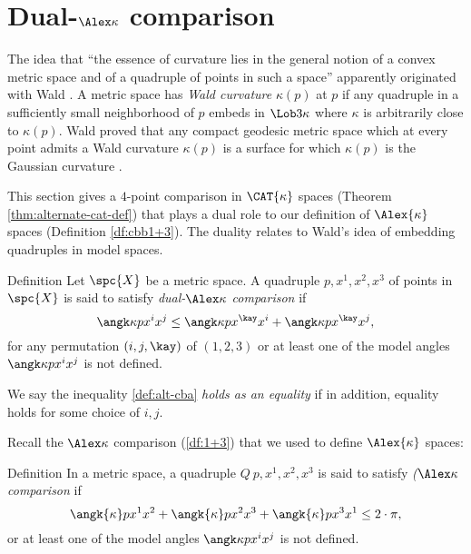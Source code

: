 
\section{Dual-$\Alex\kappa$ comparison}\label{sec:dual-1+3}



The idea that ``the essence of curvature lies in the general notion of a convex metric space and of a quadruple of points in such a space'' apparently originated with Wald \cite[p.17]{menger:wald}. A metric space has \emph{Wald curvature} $\kappa(p)$ at $p$  if  any quadruple in a sufficiently small neighborhood of $p$ embeds in $\Lob3\kappa$ where $\kappa$ is arbitrarily close to $\kappa(p)$. 
Wald proved that any compact geodesic metric space which at every point admits a Wald curvature $\kappa(p)$ is a surface for which $\kappa(p)$ is the Gaussian curvature \cite{wald}. %
  
This section gives a $4$-point comparison in $\CAT{\kappa}$ spaces (Theorem \ref{thm:alternate-cat-def}) that plays a dual role to our definition of $\Alex{\kappa}$ spaces (Definition \ref{df:cbb1+3}).  
The duality relates to Wald's idea of embedding quadruples in model spaces. 


\begin{thm}{Definition}\label{def:alt-cba}
Let $\spc{X}$ be a metric space.
A quadruple $p,x^1,x^2,x^3$ of points in $\spc{X}$ 
is said to satisfy \emph{dual-$\Alex\kappa$ comparison} if
\[
\angk\kappa p{x^i}{x^j}\le \angk\kappa p{x^\kay}{x^i} + \angk\kappa p{x^\kay}{x^j}, 
\]
for any permutation $(i,j,\kay)$ of $(1,2,3)$
or at least one of the model angles $\angk\kappa p{x^i}{x^j}$  is not defined.
\end{thm}

We say the inequality \ref{def:alt-cba} \emph{holds as an equality} if in addition, equality holds for some choice of $i,j$.

Recall the $\Alex\kappa$ comparison (\ref{df:1+3}) that we used to define $\Alex{\kappa}$ spaces:

\begin{thm}{Definition}\label{def:cbb} 
In a metric space, a quadruple $Q\:p,x^1,x^2,x^3$ is said to satisfy \emph{($\Alex\kappa$ comparison} if 
\[\angk{\kappa} p{x^1}{x^2}+\angk{\kappa} p{x^2}{x^3}+\angk{\kappa}p{x^3}{x^1}\le 2\cdot \pi,
\]
or at least one of the model angles $\angk\kappa p{x^i}{x^j}$  is not defined.
\end{thm}

